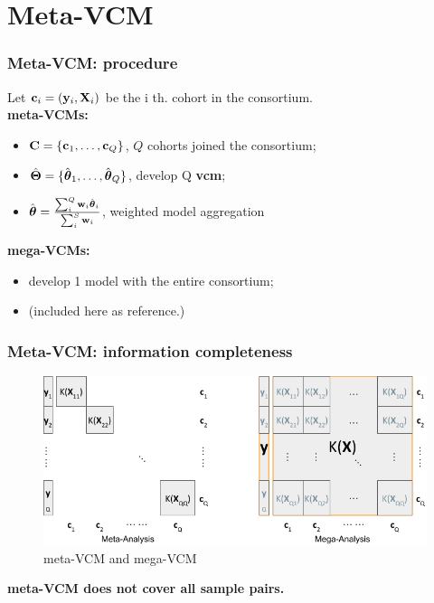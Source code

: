 \documentclass{beamer}
\begin{document}
\section{Meta-VCM}
\begin{frame}\frametitle{Meta-VCM: procedure}
  Let $\mathbf{c}_i=(\mathbf{y}_i, \mathbf{X}_i)$ be the i th. cohort in the consortium. \\
  \textbf{{\color{red}meta}-VCMs:}
  \begin{itemize}
  \item $\mathbf{C} = \{\mathbf{c}_1, \dots, \mathbf{c}_Q \}$, $Q$ cohorts joined the
    consortium;
  \item $\hat{\boldsymbol{\Theta}}=\{\hat{\boldsymbol{\theta}}_1, \dots, \hat{\boldsymbol{\theta}}_Q\}$,
    develop Q \textbf{vcm};
  \item
    $\hat{\boldsymbol{\theta}} = \frac{\sum_i^Q \mathbf{w}_i \hat{\boldsymbol{\theta}}_i}{\sum_i^S
      \mathbf{w}_i}$, weighted model aggregation
  \end{itemize}
  \textbf{{\color{red}mega}-VCMs:}
  \begin{itemize}
  \item develop 1 model with the entire consortium;
  \item (included here as reference.)
  \end{itemize}
\end{frame}
\begin{frame}\frametitle{Meta-VCM: information completeness}
  \begin{figure}
    \centering \includegraphics[width=.9\textwidth]{img/meta-mega}
    \caption{meta-VCM and mega-VCM}
    \label{fig:info_comp}
  \end{figure}
  \textbf{meta-VCM does not cover all sample pairs.}
\end{frame}
\end{document}
